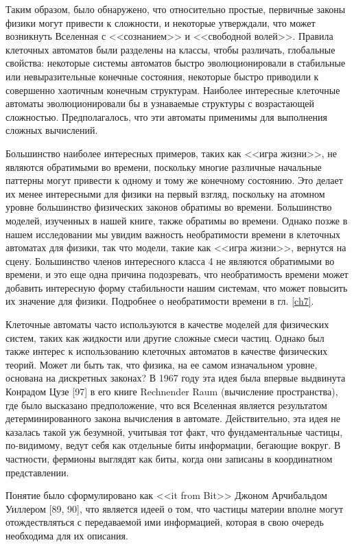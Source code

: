 \documentclass[main.tex]{subfiles}
\begin{document}
Таким образом, было обнаружено, что относительно простые, первичные законы физики могут привести к сложности, и некоторые утверждали, что может возникнуть Вселенная с <<сознанием>> и <<свободной волей>>. Правила клеточных автоматов были разделены на классы, чтобы различать, глобальные свойства: некоторые системы автоматов быстро эволюционировали в стабильные или невыразительные конечные состояния, некоторые быстро приводили к совершенно хаотичным конечным структурам. Наиболее интересные клеточные автоматы эволюционировали бы в узнаваемые структуры с возрастающей сложностью. Предполагалось, что эти автоматы применимы для выполнения сложных вычислений.

Большинство наиболее интересных примеров, таких как <<игра жизни>>, не являются обратимыми во времени, поскольку многие различные начальные паттерны могут привести к одному и тому же конечному состоянию. Это делает их менее интересными для физики на первый взгляд, поскольку на атомном уровне большинство физических законов обратимы во времени. Большинство моделей, изученных в нашей книге, также обратимы во времени. Однако позже в нашем исследовании мы увидим важность необратимости времени в клеточных автоматах для физики, так что модели, такие как <<игра жизни>>, вернутся на сцену. Большинство членов интересного класса 4 не являются обратимыми во времени, и это еще одна причина подозревать, что необратимость времени может добавить интересную форму стабильности нашим системам, что может повысить их значение для физики. Подробнее о необратимости времени в гл. \ref{ch7}. 

Клеточные автоматы часто используются в качестве моделей для физических систем, таких как жидкости или другие сложные смеси частиц. Однако был также интерес к использованию клеточных автоматов в качестве физических теорий. Может ли быть так, что физика, на ее самом изначальном уровне, основана на дискретных законах? В 1967 году эта идея была впервые выдвинута Конрадом Цузе [97] в его книге Rechnender Raum (вычисление пространства), где было высказано предположение, что вся Вселенная является результатом детерминированного закона вычисления в автомате. Действительно, эта идея не казалась такой уж безумной, учитывая тот факт, что фундаментальные частицы, по-видимому, ведут себя как отдельные биты информации, бегающие вокруг. В частности, фермионы выглядят как биты, когда они записаны в координатном представлении. 

Понятие было сформулировано как <<it from Bit>> Джоном Арчибальдом Уиллером [89, 90], что является идеей о том, что частицы материи вполне могут отождествляться с передаваемой ими информацией, которая в свою очередь необходима для их описания. 
\end{document}
